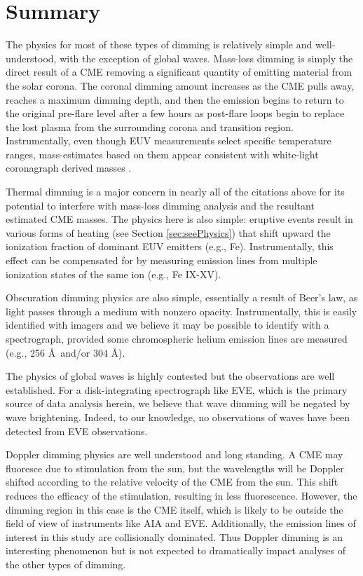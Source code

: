 \section{Summary}
The physics for most of these types of dimming is relatively simple and well-understood, with the exception of global waves. Mass-loss dimming is simply the direct result of a CME removing a significant quantity of emitting material from the solar corona. The coronal dimming amount increases as the CME pulls away, reaches a maximum dimming depth, and then the emission begins to return to the original pre-flare level after a few hours as post-flare loops begin to replace the lost plasma from the surrounding corona and transition region. Instrumentally, even though EUV measurements select specific temperature ranges, mass-estimates based on them appear consistent with white-light coronagraph derived masses \citep{Aschwanden2009}. 

Thermal dimming is a major concern in nearly all of the citations above for its potential to interfere with mass-loss dimming analysis and the resultant estimated CME masses. The physics here is also simple: eruptive events result in various forms of heating (see Section \ref{sec:seePhysics}) that shift upward the ionization fraction of dominant EUV emitters (e.g., Fe). Instrumentally, this effect can be compensated for by measuring emission lines from multiple ionization states of the same ion (e.g., Fe IX-XV).

Obscuration dimming physics are also simple, essentially a result of Beer's law, as light passes through a medium with nonzero opacity. Instrumentally, this is easily identified with imagers and we believe it may be possible to identify with a spectrograph, provided some chromospheric helium emission lines are measured (e.g., 256 \AA\ and/or 304 \AA). 

The physics of global waves is highly contested but the observations are well established. For a disk-integrating spectrograph like EVE, which is the primary source of data analysis herein, we believe that wave dimming will be negated by wave brightening. Indeed, to our knowledge, no observations of waves have been detected from EVE observations. 

Doppler dimming physics are well understood and long standing. A CME may fluoresce due to stimulation from the sun, but the wavelengths will be Doppler shifted according to the relative velocity of the CME from the sun. This shift reduces the efficacy of the stimulation, resulting in less fluorescence. However, the dimming region in this case is the CME itself, which is likely to be outside the field of view of instruments like AIA and EVE. Additionally, the emission lines of interest in this study are collisionally dominated. Thus Doppler dimming is an interesting phenomenon but is not expected to dramatically impact analyses of the other types of dimming. 


